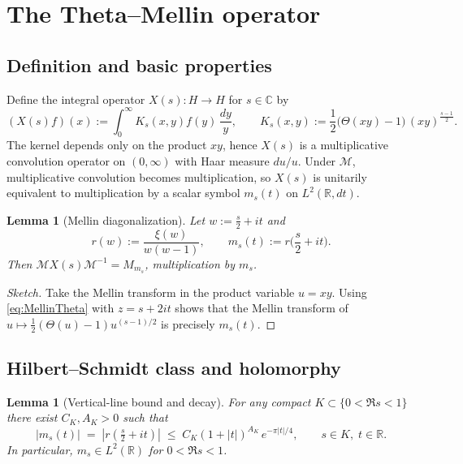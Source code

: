 \documentclass[11pt]{article}
\numberwithin{equation}{section}
\newtheorem{lemma}[theorem]{Lemma}
\theoremstyle{definition}
\theoremstyle{remark}
\newcommand{\C}{\mathbb{C}}
\newcommand{\R}{\mathbb{R}}
\newcommand{\1}{\mathbbm{1}}
\newcommand{\cM}{\mathcal{M}}
\begin{document}
\section{The Theta--Mellin operator}\label{sec:Operator}

\subsection{Definition and basic properties}
Define the integral operator \(X(s):H\to H\) for \(s\in\C\) by
\begin{equation}\label{eq:Xkernel}
(X(s)f)(x) := \int_0^\infty K_s(x,y) f(y)\,\frac{dy}{y},\qquad
K_s(x,y):=\frac12\big(\Theta(xy)-1\big)\,(xy)^{\frac{s-1}{2}}.
\end{equation}
The kernel depends only on the product \(xy\), hence \(X(s)\) is a multiplicative convolution operator on \((0,\infty)\) with Haar measure \(du/u\). Under \(\cM\), multiplicative convolution becomes multiplication, so \(X(s)\) is unitarily equivalent to multiplication by a scalar symbol \(m_s(t)\) on \(L^2(\R,dt)\).

\begin{lemma}[Mellin diagonalization]\label{lem:Diagonalization}
Let \(w:=\tfrac{s}{2}+it\) and
\begin{equation}\label{eq:symbol}
r(w):=\frac{\xi(w)}{w(w-1)},\qquad m_s(t):=r\Big(\frac{s}{2}+it\Big).
\end{equation}
Then \(\cM X(s)\cM^{-1} = M_{m_s}\), multiplication by \(m_s\).
\end{lemma}

\begin{proof}[Sketch]
Take the Mellin transform in the product variable \(u=xy\). Using \eqref{eq:MellinTheta} with \(z=s+2it\) shows that the Mellin transform of \(u\mapsto \frac12(\Theta(u)-1)u^{(s-1)/2}\) is precisely \(m_s(t)\).
\end{proof}

\subsection{Hilbert--Schmidt class and holomorphy}

\begin{lemma}[Vertical-line bound and decay]\label{lem:HSBound}
For any compact \(K\subset \{0<\Re s<1\}\) there exist \(C_K,A_K>0\) such that
\begin{equation}\label{eq:decay}
|m_s(t)| \;=\; \left| r\!\left(\tfrac{s}{2}+it\right)\right|
\;\le\; C_K (1+|t|)^{A_K}\, e^{-\pi|t|/4},\qquad s\in K,\; t\in\R.
\end{equation}
In particular, \(m_s\in L^2(\R)\) for \(0<\Re s<1\).
\end{lemma}
\end{document}
